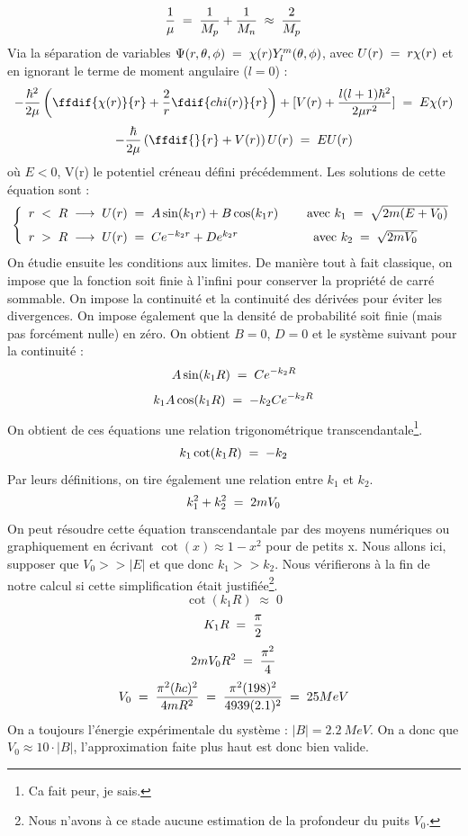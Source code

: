 \[
    \dfrac{1}{\mu} \; = \; \dfrac{1}{M_p} + \dfrac{1}{M_n} \; \approx \; \dfrac{2}{M_p}
\]
Via la séparation de variables $\Psi(r,\theta,\phi) \; = \; \chi(r)Y_l^m(\theta,\phi)$, avec $U(r) \; = \; r\chi(r)$ et en ignorant le terme de moment angulaire ($l=0$) :
\[
    -\dfrac{\hbar^2}{2\mu}\left(\ffdif{\chi(r)}{r} + \dfrac{2}{r}\fdif{chi(r)}{r}\right) + [V(r) + \dfrac{l(l+1)\hbar^2}{2\mu r^2}]\eq E\chi(r)
\]
\[
    -\dfrac{\hbar}{2\mu}\left(\ffdif{}{r} + V(r) \right)U(r) \eq EU(r)
\]
où $E<0$, V(r) le potentiel créneau défini précédemment.
Les solutions de cette équation sont :
\[
    \left\{
    \begin{array}{ll}
        r \;<\; R\; \longrightarrow \; U(r) \; = \; A \sin(k_1 r) + B \cos(k_1 r) \qquad \; \text{avec } k_1 \; = \; \sqrt{2m(E+V_0)}
    \\[7pt]
         r \;>\; R\; \longrightarrow \; U(r) \; = \; C e^{-k_2r} + D e^{k_2 r} \qquad \qquad \qquad \text{avec } k_2 \; = \; \sqrt{2mV_0}
    \end{array}
    \right.
\]
On étudie ensuite les conditions aux limites. De manière tout à fait classique, on impose que la fonction soit finie à l'infini pour conserver la propriété de carré sommable. On impose la continuité et la continuité des dérivées pour éviter les divergences. On impose également que la densité de probabilité soit finie (mais pas forcément nulle) en zéro. On obtient $B = 0$, $D = 0$ et le système suivant pour la continuité :
\[
    A \sin(k_1R) \; = \; Ce^{-k_2 R}
\]
\[
    k_1A\cos(k_1R) \; = \; -k_2 C e^{-k_2 R}
\]
On obtient de ces équations une relation trigonométrique transcendantale\footnote{Ca fait peur, je sais.}.
\[
    k_1 \cot(k_1R)  \; = \; -k_2
\]
Par leurs définitions, on tire également une relation entre $k_1$ et $k_2$.
\[
    k_1^2 + k_2^2 \; = \; 2mV_0
\]
On peut résoudre cette équation transcendantale par des moyens numériques ou graphiquement en écrivant $\cot(x) \approx 1 - x^2$ pour de petits x. Nous allons ici, supposer que $V_0 >> |E|$ et que donc $k_1 >> k_2$. Nous vérifierons à la fin de notre calcul si cette simplification était justifiée\footnote{Nous n'avons à ce stade aucune estimation de la profondeur du puits $V_0$.}.
\[
    \cot(k_1R) \; \approx \; 0
\]
\[
    K_1 R \; = \; \dfrac{\pi}{2}
\]
\[
    2mV_0 R^2 \; = \; \dfrac{\pi^2}{4}
\]
\[
    V_0 \; = \; \dfrac{\pi^2(\hbar c)^2}{4mR^2} \; = \; \dfrac{\pi^2 (198)^2}{4 939 (2.1)^2}
    \; = \; 25{MeV}
\]
On a toujours l'énergie expérimentale du système : $|B| = \SI{2.2}{MeV}$. On a donc que $V_0 \approx 10\cdot|B|$, l'approximation faite plus haut est donc bien valide.\\
